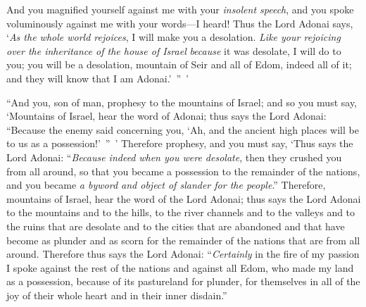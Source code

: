 \begin{biblechapter}
\verse And you magnified yourself against me with your \textit{insolent speech}, and you spoke voluminously against me with your words—I heard!
\verse Thus the Lord Adonai says, ‘\textit{As the whole world rejoices}, I will make you a desolation.
\verse \textit{Like your rejoicing over the inheritance of the house of Israel} \textit{because} it was desolate, I will do to you; you will be a desolation, mountain of Seir and all of Edom, indeed all of it; and they will know that I am Adonai.’ ” ’
\end{biblechapter}

\begin{biblechapter} %
 “And you, son of man, prophesy to the mountains of Israel; and so you must say, ‘Mountains of Israel, hear the word of Adonai;
\verse thus says the Lord Adonai: “Because the enemy said concerning you, ‘Ah, and the ancient high places will be to us as a possession!’ ” ’
\verse Therefore prophesy, and you must say, ‘Thus says the Lord Adonai: “\textit{Because indeed} \textit{when you were desolate}, then they crushed you from all around, so that you became a possession to the remainder of the nations, and you became \textit{a byword and object of slander for the people}.”
\verse Therefore, mountains of Israel, hear the word of the Lord Adonai; thus says the Lord Adonai to the mountains and to the hills, to the river channels and to the valleys and to the ruins that are desolate and to the cities that are abandoned and that have become as plunder and as scorn for the remainder of the nations that are from all around.
\verse Therefore thus says the Lord Adonai: “\textit{Certainly} in the fire of my passion I spoke against the rest of the nations and against all Edom, who made my land as a possession, because of its pastureland for plunder, for themselves in all of the joy of their whole heart and in their inner disdain.”

\end{biblechapter}
